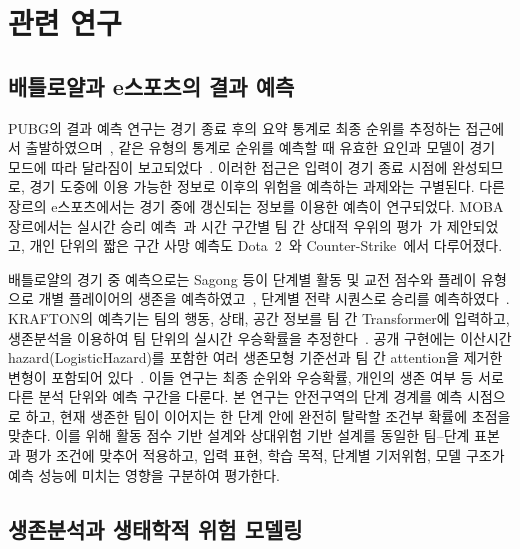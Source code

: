 \section{관련 연구}
\label{sec:related}

\subsection{배틀로얄과 e스포츠의 결과 예측}
\label{sec:related:esports}

PUBG의 결과 예측 연구는 경기 종료 후의 요약 통계로 최종 순위를 추정하는 접근에서 출발하였으며~\cite{KagglePUBG}, 같은 유형의 통계로 순위를 예측할 때 유효한 요인과 모델이 경기 모드에 따라 달라짐이 보고되었다~\cite{LeeLee25}.
이러한 접근은 입력이 경기 종료 시점에 완성되므로, 경기 도중에 이용 가능한 정보로 이후의 위험을 예측하는 과제와는 구별된다.
다른 장르의 e스포츠에서는 경기 중에 갱신되는 정보를 이용한 예측이 연구되었다.
MOBA 장르에서는 실시간 승리 예측~\cite{Hodge21}과 시간 구간별 팀 간 상대적 우위의 평가~\cite{Yu19}가 제안되었고, 개인 단위의 짧은 구간 사망 예측도 Dota~2~\cite{Katona19,Ringer23}와 Counter-Strike~\cite{Marshall22}에서 다루어졌다.

배틀로얄의 경기 중 예측으로는 Sagong 등이 단계별 활동 및 교전 점수와 플레이 유형으로 개별 플레이어의 생존을 예측하였고~\cite{Sagong25a}, 단계별 전략 시퀀스로 승리를 예측하였다~\cite{Sagong25b}.
KRAFTON의 예측기는 팀의 행동, 상태, 공간 정보를 팀 간 Transformer에 입력하고, 생존분석을 이용하여 팀 단위의 실시간 우승확률을 추정한다~\cite{KRAFTON}.
공개 구현에는 이산시간 hazard(LogisticHazard)를 포함한 여러 생존모형 기준선과 팀 간 attention을 제거한 변형이 포함되어 있다~\cite{KRAFTON}.
이들 연구는 최종 순위와 우승확률, 개인의 생존 여부 등 서로 다른 분석 단위와 예측 구간을 다룬다.
본 연구는 안전구역의 단계 경계를 예측 시점으로 하고, 현재 생존한 팀이 이어지는 한 단계 안에 완전히 탈락할 조건부 확률에 초점을 맞춘다.
이를 위해 활동 점수 기반 설계와 상대위험 기반 설계를 동일한 팀--단계 표본과 평가 조건에 맞추어 적용하고, 입력 표현, 학습 목적, 단계별 기저위험, 모델 구조가 예측 성능에 미치는 영향을 구분하여 평가한다.

\subsection{생존분석과 생태학적 위험 모델링}
\label{sec:related:survival}

